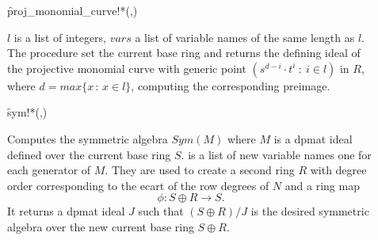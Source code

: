 \begin{description}
\item[]
  \begin{syntax}
    \f{proj\_monomial\_curve!*}(,)
  \end{syntax}
  \hypertarget{procedure:PROJ_MONOMIAL_CURVE!*}{}
$l$ is a list of integers, $vars$ a list of variable names of the
same length as $l$. The procedure set the current base ring and
returns the defining ideal of the projective monomial curve with
generic point \mbox{$(s^{d-i}\cdot t^i\ :\ i\in l)$} in $R$, where
\mbox{$d=max\{ x\, :\, x\in l\}$}, computing the corresponding preimage.

\item[]
  \begin{syntax}
    \f{sym!*}(,)
  \end{syntax}
  \hypertarget{procedure:SYM!*}{}
Computes the symmetric algebra $Sym(M)$ where $M$ is a dpmat ideal
defined over the current base ring $S$.  is a list of new
variable names one for each generator of $M$. They are used to create
a second ring $R$ with degree order corresponding to the ecart of the
row degrees of $N$ and a ring map
\[\phi : S\oplus R\longrightarrow S.\]
It returns a dpmat ideal $J$ such that $(S\oplus R)/J$ is the
desired symmetric algebra over the new current base ring $S\oplus R$.

\end{description}


